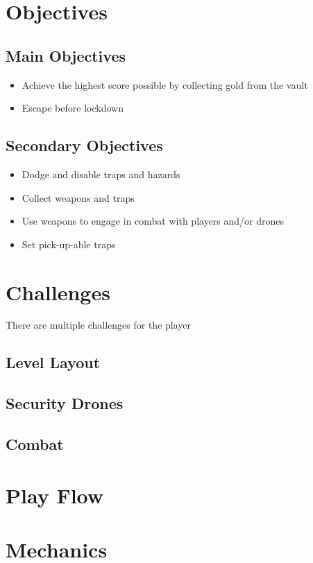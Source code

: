 \documentclass{report}
\begin{document}
\section{Objectives}
\subsection{Main Objectives}
\begin{itemize}
    \item Achieve the highest score possible by collecting gold from the vault
    \item Escape before lockdown
\end{itemize}
\subsection{Secondary Objectives}
\begin{itemize}
    \item Dodge and disable traps and hazards
    \item Collect weapons and traps
    \item Use weapons to engage in combat with players and/or drones
    \item Set pick-up-able traps
\end{itemize}

\section{Challenges}
There are multiple challenges for the player
\subsection{Level Layout}

\subsection{Security Drones}

\subsection{Combat}


\section{Play Flow}

\section{Mechanics}
\end{document}
